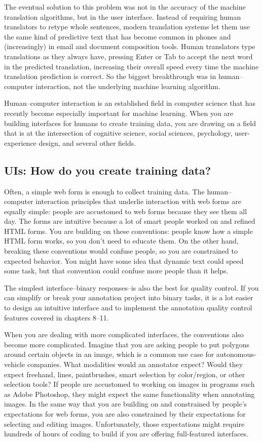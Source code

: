 \documentclass[sigconf,nonacm,screen,pbalance]{acmart}
\begin{document}
The
eventual solution to this problem was not in the accuracy of the machine translation
algorithms, but in the user interface. Instead of requiring human translators to retype
whole sentences, modern translation systems let them use the same kind of predictive
text that has become common in phones and (increasingly) in email and document
composition tools. Human translators type translations as they always have, pressing
Enter or Tab to accept the next word in the predicted translation, increasing their
overall speed every time the machine translation prediction is correct. So the biggest
breakthrough was in human–computer interaction, not the underlying machine learning
algorithm.

Human–computer
interaction is an established field in computer science that has recently become
especially important for machine learning. When you are building interfaces for humans
to create training data, you are drawing on a field that is at the intersection of
cognitive science, social sciences, psychology, user-experience design, and several
other fields.

\subsection{UIs: How do you create training data?}
Often,
a
simple web form is enough to collect training data. The human–computer interaction
principles that underlie interaction with web forms are equally simple: people are
accustomed to web forms because they see them all day. The forms are intuitive because a
lot of smart people worked on and refined HTML forms. You are building on these
conventions: people know how a simple HTML form works, so you don't need to educate
them. On the other hand, breaking these conventions would confuse people, so you are
constrained to expected behavior. You might have some idea that dynamic text could speed
some task, but that convention could confuse more people than it helps.

The
simplest interface--binary responses--is also the best for quality control. If you can
simplify or break your annotation project into binary tasks, it is a lot easier to
design an intuitive interface and to implement the annotation quality control features
covered in chapters 8–11.

When
you are dealing with more complicated interfaces, the conventions also become more
complicated. Imagine that you are asking people to put polygons around certain objects
in an image, which is a common use case for autonomous-vehicle companies. What
modalities would an annotator expect? Would they expect freehand, lines, paintbrushes,
smart selection by color/region, or other selection tools? If people are accustomed to
working on images in programs such as Adobe Photoshop, they might expect the same
functionality when annotating images. In the same way that you are building on and
constrained by people's expectations for web forms, you are also constrained by their
expectations for selecting and editing images. Unfortunately, those expectations might
require hundreds of hours of coding to build if you are offering full-featured
interfaces.
\end{document}
